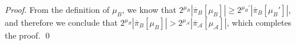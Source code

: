 \begin{proof}
    From the definition of $\mu_B$, we know that
    $2^{\mu_B}|\overline\pi_B[\mu_B]| \geq 2^{\mu_B'}|\overline\pi_B[\mu_B']|$,
    and therefore we conclude that $2^{\mu_B}|\overline\pi_B[\mu_B]| >
    2^{\mu_\mathcal{A}}|\overline\pi_\mathcal{A}[\mu_\mathcal{A}]|$, which
    completes the proof.
    \qed
%
\end{proof}
